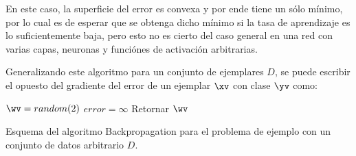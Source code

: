 En este caso, la superficie del error es convexa y por ende tiene un sólo mínimo, por lo cual es de esperar que se obtenga dicho mínimo si la tasa de aprendizaje es lo suficientemente baja, pero esto no es cierto del caso general en una red con varias capas, neuronas y funciónes de activación arbitrarias. 

Generalizando este algoritmo para un conjunto de ejemplares $D$, se puede escribir el opuesto del gradiente del error de un ejemplar $\xv$ con clase $\yv$ como:


\begin{algorithm}[H]
$\wv=random(2)$\;
$error=\infty$ \;
Retornar  $\wv$ \;
\caption{Esquema del algoritmo Backpropagation para el problema de ejemplo con un conjunto de datos arbitrario $D$.} 
\end{algorithm}
\vspace{10pt}

